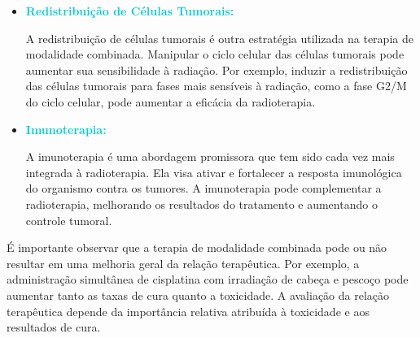 \documentclass[11pt,a4paper]{article}
\newcounter{exemplo}
\begin{document}
\begin{itemize}[label=\textcolor{CarnationPink}{$\blacktriangleright$}]
		\item \textcolor{DarkTurquoise}{\textbf{Redistribuição de Células Tumorais:}}
		
		A redistribuição de células tumorais é outra estratégia utilizada na terapia de modalidade combinada. Manipular o ciclo celular das células tumorais pode aumentar sua sensibilidade à radiação. Por exemplo, induzir a redistribuição das células tumorais para fases mais sensíveis à radiação, como a fase G2/M do ciclo celular, pode aumentar a eficácia da radioterapia.

		\item \textcolor{DarkTurquoise}{\textbf{Imunoterapia: }}  
		
		A imunoterapia é uma abordagem promissora que tem sido cada vez mais integrada à radioterapia. Ela visa ativar e fortalecer a resposta imunológica do organismo contra os tumores. A imunoterapia pode complementar a radioterapia, melhorando os resultados do tratamento e aumentando o controle tumoral.

	\end{itemize}

	É importante observar que a terapia de modalidade combinada pode ou não resultar em uma melhoria geral da relação terapêutica. Por exemplo, a administração simultânea de cisplatina com irradiação de cabeça e pescoço pode aumentar tanto as taxas de cura quanto a toxicidade. A avaliação da relação terapêutica depende da importância relativa atribuída à toxicidade e aos resultados de cura.





\end{document}

